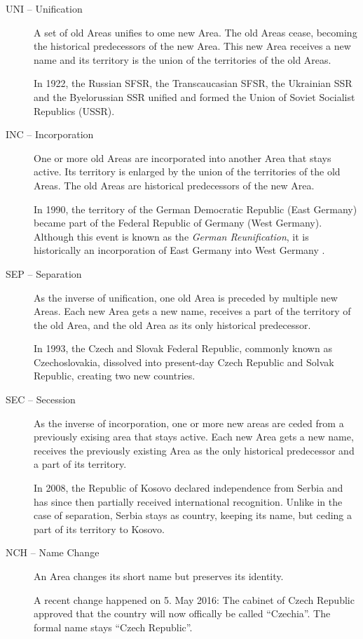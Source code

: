 \begin{description}
  \item[UNI -- Unification]
  A set of old Areas unifies to ome new Area. The old Areas cease, becoming the historical predecessors of the new Area. This new Area receives a new name and its territory is the union of the territories of the old Areas. \\
  \begin{footnotesize}
    In 1922, the Russian SFSR, the Transcaucasian SFSR, the Ukrainian SSR and the Byelorussian SSR unified and formed the Union of Soviet Socialist Republics (USSR).
  \end{footnotesize}
  \item[INC -- Incorporation]
  One or more old Areas are incorporated into another Area that stays active. Its territory is enlarged by the union of the territories of the old Areas. The old Areas are historical predecessors of the new Area. \\
  \begin{footnotesize}
    In 1990, the territory of the German Democratic Republic (East Germany) became part of the Federal Republic of Germany (West Germany). Although this event is known as the \emph{German Reunification}, it is historically an incorporation of East Germany into West Germany \cite{incorporationEastWestGermany}.
  \end{footnotesize}
  \item[SEP -- Separation]
  As the inverse of unification, one old Area is preceded by multiple new Areas. Each new Area gets a new name, receives a part of the territory of the old Area, and the old Area as its only historical predecessor. \\
  \begin{footnotesize}
    In 1993, the Czech and Slovak Federal Republic, commonly known as Czechoslovakia, dissolved into present-day Czech Republic and Solvak Republic, creating two new countries.
  \end{footnotesize}
  \item[SEC -- Secession]
  As the inverse of incorporation, one or more new areas are ceded from a previously exising area that stays active. Each new Area gets a new name, receives the previously existing Area as the only historical predecessor and a part of its territory. \\
  \begin{footnotesize}
    In 2008, the Republic of Kosovo declared independence from Serbia and has since then partially received international recognition. Unlike in the case of separation, Serbia stays as country, keeping its name, but ceding a part of its territory to Kosovo.
  \end{footnotesize}
  \item[NCH -- Name Change]
  An Area changes its short name but preserves its identity. \\
  \begin{footnotesize}
    A recent change happened on 5. May 2016: The cabinet of Czech Republic approved that the country will now offically be called ``Czechia''. The formal name stays ``Czech Republic''.
  \end{footnotesize}
\end{description}

